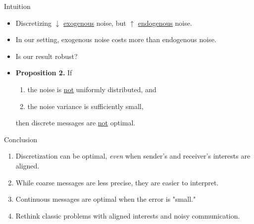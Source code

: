 \documentclass[hyperref={colorlinks=true,linkcolor=blue,citecolor=blue}]{beamer}
\begin{document}
\begin{frame}{Intuition}
\begin{center}
\end{center}
\begin{itemize}
\item Discretizing $\downarrow$ \underline{exogenous} noise, but $\uparrow$ \underline{endogenous} noise.
\item In our setting, exogenous noise costs more than endogenous noise. 
\item Is our result robust?
\item\textbf{Proposition 2.} If 
\begin{enumerate} 
\item the noise is \underline{not} uniformly distributed, and 
\item the noise variance is sufficiently small, 
\end{enumerate}
then discrete messages are \underline{not} optimal. 
\end{itemize}
\end{frame}

\begin{frame}{Conclusion}
\begin{enumerate}
\item Discretization can be optimal, \textit{even} when sender's and receiver's interests are aligned.
\item While coarse messages are less precise, they are easier to interpret.
\item Continuous messages are optimal when the error is "small."
\item Rethink classic problems with aligned interests and noisy communication.
\end{enumerate}
\end{frame}
\end{document}
